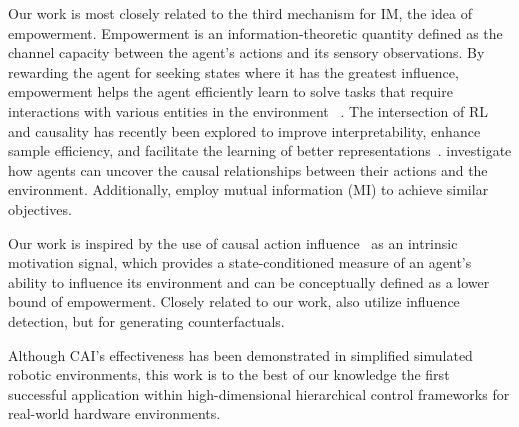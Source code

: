 Our work is most closely related to the third mechanism for IM, the idea of empowerment. 
Empowerment \citep{klyubin2005empowerment} is an information-theoretic quantity defined as the channel capacity between the agent's actions and its sensory observations. 
By rewarding the agent for seeking states where it has the greatest influence, empowerment helps the agent efficiently learn to solve tasks that require interactions with various entities in the environment ~\cite{mohamed2015variational,zhao2021mutual,jung2011empowerment}.
The intersection of RL and causality has recently been explored to improve interpretability, enhance sample efficiency, and facilitate the learning of better representations~\citep{buesing2018woulda, bareinboim2015bandits, lu2018deconfounding, rezende2020causally}. 
\citet{sontakke2021causal} investigate how agents can uncover the causal relationships between their actions and the environment.
Additionally, \citet{zhao2021mutual} employ mutual information (MI) to achieve similar objectives. 

Our work is inspired by the use of causal action influence~\cite{seitzer2021causal} as an intrinsic motivation signal, which provides a state-conditioned measure of an agent’s ability to influence its environment and can be conceptually defined as a lower bound of empowerment. 
Closely related to our work, \citet{pitis2020, urpicausal} also utilize influence detection, but for generating counterfactuals.

Although CAI’s effectiveness has been demonstrated in simplified simulated robotic environments, this work is to the best of our knowledge the first successful application within high-dimensional hierarchical control frameworks for real-world hardware environments.